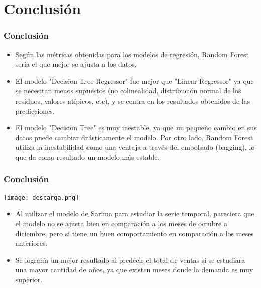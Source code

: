 \documentclass{beamer}
\begin{document}
\section{Conclusión}
\begin{frame}
\frametitle{Conclusión}

\begin{itemize}
    \item Según las métricas obtenidas para los modelos de regresión, Random Forest sería el que mejor se ajusta a los datos.
    \item El modelo "Decision Tree Regressor" fue mejor que "Linear Regressor" ya que se necesitan menos supuestos (no colinealidad, distribución normal de los residuos, valores atípicos, etc), y se centra en los resultados obtenidos de las predicciones.
    \item El modelo "Decision Tree" es muy inestable, ya que un pequeño cambio en sus datos puede cambiar drásticamente el modelo. Por otro lado, Random Forest utiliza la inestabilidad como una ventaja a través del embolsado (bagging), lo que da como resultado un modelo más estable.

\end{itemize}

\end{frame}

\begin{frame}
\frametitle{Conclusión}
\begin{center}
    \texttt{[image: descarga.png]}
\end{center}
\begin{itemize}
    \item Al utilizar el modelo de Sarima para estudiar la serie temporal, pareciera que el modelo no se ajusta bien en comparación a los meses de octubre a diciembre, pero si tiene un buen comportamiento en comparación a los meses anteriores.
    \item Se lograría un mejor resultado al predecir el total de ventas si se estudiara una mayor cantidad de años, ya que existen meses donde la demanda es muy superior.
\end{itemize}
\end{frame}




\end{document}
